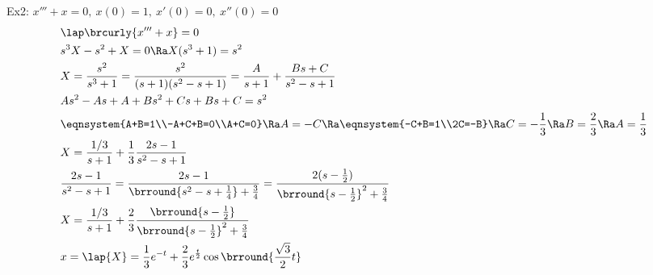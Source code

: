 Ex2: $x'''+x=0,\ x(0)=1,\ x'(0)=0,\ x''(0)=0$
\begin{align*}
    &\lap\brcurly{x'''+x}=0\\
    &s^3X-s^2+X=0\Ra X(s^3+1)=s^2\\
    &X=\frac{s^2}{s^3+1}=\frac{s^2}{(s+1)(s^2-s+1)}=\frac{A}{s+1}+\frac{Bs+C}{s^2-s+1}\\
    &As^2-As+A+Bs^2+Cs+Bs+C=s^2\\
    &\eqnsystem{A+B=1\\-A+C+B=0\\A+C=0}\Ra A=-C\Ra \eqnsystem{-C+B=1\\2C=-B}\Ra C=-\frac{1}{3}\Ra B=\frac{2}{3}\Ra A=\frac{1}{3}\\
    &X=\frac{1/3}{s+1}+\frac{1}{3}\frac{2s-1}{s^2-s+1}\\
    &\frac{2s-1}{s^2-s+1}=\frac{2s-1}{\brround{s^2-s+\frac{1}{4}}+\frac{3}{4}}=\frac{2(s-\frac{1}{2})}{\brround{s-\frac{1}{2}}^2+\frac{3}{4}}\\
    &X=\frac{1/3}{s+1}+\frac{2}{3}\frac{\brround{s-\frac{1}{2}}}{\brround{s-\frac{1}{2}}^2+\frac{3}{4}}\\
    &x=\lap\{X\}=\frac{1}{3}e^{-t}+\frac{2}{3}e^{\frac{t}{2}}\cos\brround{\frac{\sqrt{3}}{2}t}
\end{align*}

